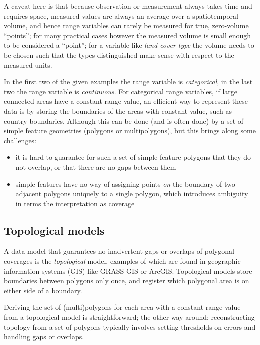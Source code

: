 \documentclass[]{book}
\providecommand{\tightlist}{%
  \setlength{\itemsep}{0pt}\setlength{\parskip}{0pt}}
\begin{document}
A caveat here is that because observation or measurement always takes
time and requires space, measured values are always an average over
a spatiotemporal volume, and hence range variables can rarely be
measured for true, zero-volume ``points''; for many practical cases
however the measured volume is small enough to be considered a
``point''; for a variable like \emph{land cover type} the volume needs to
be chosen such that the types distinguished make sense with respect
to the measured units.

In the first two of the given examples the range variable is
\emph{categorical}, in the last two the range variable is \emph{continuous}.
For categorical range variables, if large connected areas have a
constant range value, an efficient way to represent these data
is by storing the boundaries of the areas with constant value, such
as country boundaries. Although this can be done (and is often done)
by a set of simple feature geometries (polygons or multipolygons),
but this brings along some challenges:

\begin{itemize}
\tightlist
\item
  it is hard to guarantee for such a set of simple feature polygons that they do not overlap, or that there are no gaps between them
\item
  simple features have no way of assigning points \emph{on} the boundary of two adjacent polygons uniquely to a single polygon, which introduces ambiguity in terms the interpretation as coverage
\end{itemize}

\hypertarget{topological-models}{%
\subsection{Topological models}\label{topological-models}}

A data model that guarantees no inadvertent gaps or overlaps of
polygonal coverages is the \emph{topological} model, examples of which
are found in geographic information systems (GIS) like GRASS GIS
or ArcGIS. Topological models store boundaries between polygons
only once, and register which polygonal area is on either side
of a boundary.

Deriving the set of (multi)polygons for each area with a constant
range value from a topological model is straightforward; the other
way around: reconstructing topology from a set of polygons typically
involves setting thresholds on errors and handling gaps or overlaps.
\end{document}
